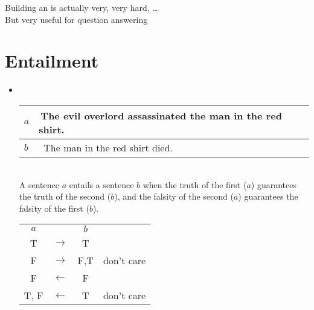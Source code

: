 \documentclass[headrule,footrule]{foils}
\begin{document}
Building an  is actually very, very hard, \ldots
\\ But very useful for question answering

\section{Entailment}

\begin{itemize}
\item {} \\[2ex]
  \begin{tabular}{ll}
    $a$ & The evil overlord  assassinated the man in the red shirt. \\ \hline
    $b$ &  The man  in the red shirt died.
  \end{tabular}
  \\[2ex]
  A sentence $a$ entails a sentence $b$ when the truth of the first ($a$)
  guarantees the truth of the second ($b$), and the falsity of the
  second ($a$) guarantees the falsity of the first ($b$).
\begin{center}
  \begin{tabular}{|c|c|c|l}
    \cline{1-3}
    $a$ &  & $b$   \\
    \cline{1-3}
    T & $\rightarrow$  & T  \\ 
    F & $\rightarrow$  & F,T & don't care\\ 
    F & $\leftarrow$  & F  \\ 
    T, F & $\leftarrow$  & T  & don't care\\ 
    \cline{1-3}
  \end{tabular}
\end{center}
\end{itemize}
\end{document}
